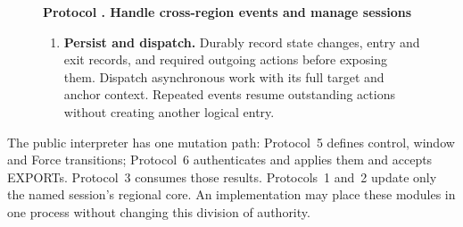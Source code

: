 \documentclass[11pt,a4paper]{article}
\newcounter{protocol}
\newenvironment{protocol}[3][htbp]{\begin{figure}[#1]\refstepcounter{protocol}\label{#2}
\begin{mdframed}[linewidth=.6pt,skipabove=0pt,skipbelow=0pt,
innertopmargin=7pt,innerbottommargin=7pt]\small
\textbf{Protocol \theprotocol. #3}\par\smallskip}{\end{mdframed}\end{figure}}
\begin{document}
\begin{protocol}[H]{alg:rotation}{Handle cross-region events and manage sessions}
\begin{enumerate}[label=\textbf{\arabic*)},itemsep=3pt]
program with a fixed handoff, check \cref{def:ready}. In the same local
event, recheck public validity and the durable entry flag, record Ready,
and invoke Protocol~4 Enter atomically. A failed check leaves Waiting
or applies a justified cancellation; it does not partially initialize
the engine.
\item \textbf{Persist and dispatch.} Durably record state changes,
entry and exit records, and required outgoing actions before exposing
them. Dispatch asynchronous work with its full target and anchor
context. Repeated events resume outstanding actions without creating
another logical entry.
\end{enumerate}
\end{protocol}

The public interpreter has one mutation path: Protocol~5 defines
control, window and Force transitions; Protocol~6 authenticates and
applies them and accepts EXPORTs. Protocol~3 consumes those results.
Protocols~1 and~2 update only the named session's regional core.
An implementation may place these modules in one process without
changing this division of authority.
\end{document}
